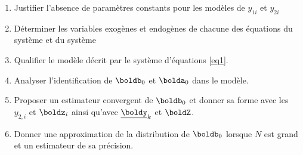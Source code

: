 \begin{enumerate}
    \item Justifier l’absence de paramètres constants pour les modèles de $y_{1i}$ et $y_{2i}$ 
    \item  Déterminer les variables exogènes et endogènes de chacune des équations
    du système et du système
    \item Qualifier le modèle décrit par le système d’équations \eqref{eq1}.
    \item Analyser l’identification de $\boldb_0$ et $\bolda_0$ dans le modèle.  
    \item Proposer un estimateur convergent de $\boldb_0$ et donner sa forme avec les $y_{2,i}$ et $\boldz_i$ 
    ainsi qu’avec $\underline{\boldy}_k$ et $\boldZ$.
    \item Donner une approximation de la distribution de $\boldb_0$ lorsque $N$ est grand et un estimateur de sa précision.
\end{enumerate}



 
